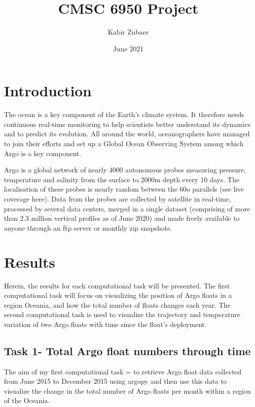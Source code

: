 \documentclass[12pt]{article}
\title{CMSC 6950 Project}
\date{June 2021}
\author{Kabir Zubaer}
\begin{document}
\maketitle
\section{Introduction}

The ocean is a key component of the Earth’s climate system. It therefore needs continuous
real-time monitoring to help scientists better understand its dynamics and to predict its evolution. All around the world, oceanographers have managed to join their efforts and set up a
Global Ocean Observing System among which Argo is a key component.

Argo is a global network of nearly 4000 autonomous probes measuring pressure, temperature
and salinity from the surface to 2000m depth every 10 days. The localisation of these probes
is nearly random between the 60o parallels (see live coverage here). Data from the probes
are collected by satellite in real-time, processed by several data centers, merged in a single
dataset (comprising of more than 2.3 million vertical profiles as of June 2020) and made freely
available to anyone through an ftp server or monthly zip snapshots.

\section{Results}

Herein, the results for each computational task will be presented. The first computational task will focus on visualizing the position of Argo floats in a region Oceania,  and how the total number of floats changes each year. The second computational task is used to visualize the trajectory and temperature variation of two Argo floats with time since the float's deployment.
  
\subsection{Task 1- Total Argo float numbers through time}

The aim of my first computational task = to retrieve Argo float data collected from June 2015 to December 2015 using argopy and then use this data to visualize the change in the total number of Argo floats per month within a region of the Oceania.  
\end{document}
